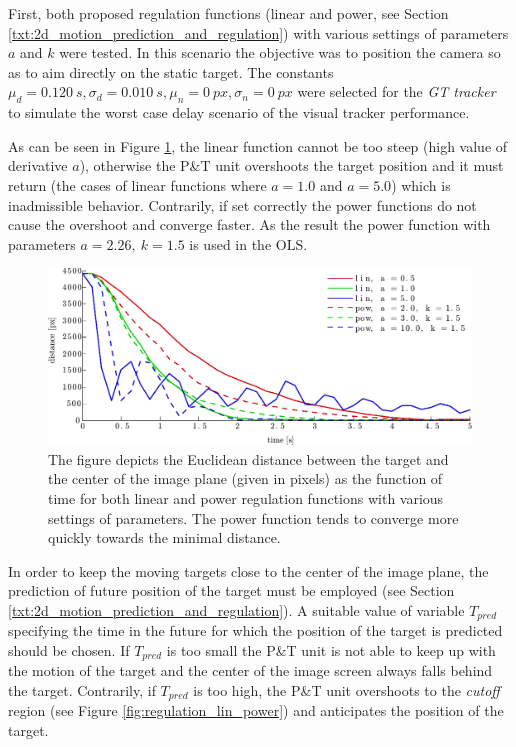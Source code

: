 First, both proposed regulation functions (linear and power, see Section \ref{txt:2d_motion_prediction_and_regulation}) with various settings of parameters $a$ and $k$ were tested. In this scenario the objective was to position the camera so as to aim directly on the static target. The constants $\mu_{d} = 0.120~s, \sigma_{d} = 0.010~s, \mu_{n} = 0~px, \sigma_{n} = 0~px$ were selected for the \textit{GT tracker} to simulate the worst case delay scenario of the visual tracker performance.

As can be seen in Figure \ref{fig:test_reg_lin_pow}, the linear function cannot be too steep (high value of derivative $a$), otherwise the P\&T unit overshoots the target position and it must return (the cases of linear functions where $a = 1.0$ and $a = 5.0$) which is inadmissible behavior. Contrarily, if set correctly the power functions do not cause the overshoot and converge faster. As the result the power function with parameters $a = 2.26,~k = 1.5$ is used in the OLS.

\begin{figure}[htb]\centering
	\centering
	\includegraphics[width=0.75\linewidth]{fig/test_regulation_lin_pow.pdf}
	\caption{The figure depicts the Euclidean distance between the target and the center of the image plane (given in pixels) as the function of time for both linear and power regulation functions with various settings of parameters. The power function tends to converge more quickly towards the minimal distance.}
	\label{fig:test_reg_lin_pow}
\end{figure}

In order to keep the moving targets close to the center of the image plane, the prediction of future position of the target must be employed (see Section \ref{txt:2d_motion_prediction_and_regulation}). A suitable value of variable $T_{pred}$ specifying the time in the future for which the position of the target is predicted should be chosen. If $T_{pred}$ is too small the P\&T unit is not able to keep up with the motion of the target and the center of the image screen always falls behind the target. Contrarily, if $T_{pred}$ is too high, the P\&T unit overshoots to the \textit{cutoff} region (see Figure \ref{fig:regulation_lin_power}) and anticipates the position of the target.

